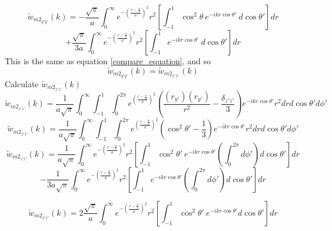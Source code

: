 \documentclass[12pt]{article}
\begin{document}
\color{blue}
\begin{displaymath}{\widetilde{w}_{{m2}_{y'y'}}(k)=-\frac{\sqrt{\pi}}{a}\int_{0}^{\infty}e^{-\left(\frac{r-\frac{\alpha}{2}}{a}\right)^2}r^2\left[\int_{-1}^{1}\cos^2\theta~e^{-ikr\cos\theta'}~d{\cos\theta'}\right]d{r}}\end{displaymath} 
\begin{equation}{+\frac{\sqrt{\pi}}{3a}\int_{0}^{\infty}e^{-\left(\frac{r-\frac{\alpha}{2}}{a}\right)^2}r^2\left[\int_{-1}^{1}e^{-ikr\cos\theta'}~d{\cos\theta'}\right]d{r}}\end{equation}
\color{black} 
\[{}\]
This is the same as equation \ref{compare_equation}, and so \begin{equation}{\widetilde{w}_{{m2}_{y'y'}}(k)=\widetilde{w}_{{m2}_{x'x'}}(k)}\end{equation}
Calculate $\widetilde{w}_{{m2}_{z'z'}}(k)$ 
\begin{equation}{\widetilde{w}_{{m2}_{z'z'}}(k)=\frac{1}{a\sqrt{\pi}}\int_{0}^{\infty}\int_{-1}^{1}\int_{0}^{2\pi}e^{\left(\frac{r-\frac{\alpha}{2}}{a}\right)^2}\left(\frac{(r_{y'})(r_{y'})}{r^2}-\frac{\delta_{z'z'}}{3}\right)e^{-ikr\cos\theta'}r^2d{r}d{\cos\theta'}d{\phi'}}\end{equation}
\begin{equation}{\widetilde{w}_{{m2}_{z'z'}}(k)=\frac{1}{a\sqrt{\pi}}\int_{0}^{\infty}\int_{-1}^{1}\int_{0}^{2\pi}e^{\left(\frac{r-\frac{\alpha}{2}}{a}\right)^2}\left(\cos^2\theta'-\frac{1}{3}\right)e^{-ikr\cos\theta'}r^2d{r}d{\cos\theta'}d{\phi'}}\end{equation}
\[{}\]
\begin{displaymath}{\widetilde{w}_{{m2}_{z'z'}}(k)=\frac{1}{a\sqrt{\pi}}\int_{0}^{\infty}e^{-\left(\frac{r-\frac{\alpha}{2}}{a}\right)^2}r^2\left[\int_{-1}^{1}\cos^2\theta'~e^{-ikr\cos\theta'}\left(\int_{0}^{2\pi}d{\phi'}\right)d{\cos\theta'}\right]d{r}}\end{displaymath} 
\begin{equation}{-\frac{1}{3a\sqrt{\pi}}\int_{0}^{\infty}e^{-\left(\frac{r-\frac{\alpha}{2}}{a}\right)^2}r^2\left[\int_{-1}^{1}e^{-ikr\cos\theta'}\left(\int_{0}^{2\pi}d{\phi'}\right)d{\cos\theta'}\right]d{r}}\end{equation}

\color{blue}
\begin{displaymath}{\widetilde{w}_{{m2}_{z'z'}}(k)=2\frac{\sqrt{\pi}}{a}\int_{0}^{\infty}e^{-\left(\frac{r-\frac{\alpha}{2}}{a}\right)^2}r^2\left[\int_{-1}^{1}\cos^2\theta'~e^{-ikr\cos\theta'}d{\cos\theta'}\right]d{r}}\end{displaymath} 
\end{document}
